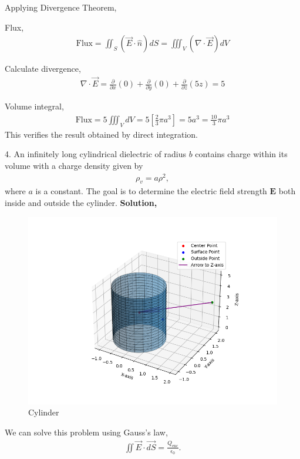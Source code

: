 \documentclass{article}
\begin{document}
Applying Divergence Theorem,

Flux,
\begin{align*}
\text{Flux} = \iint_S (\vec{E} \cdot \hat{n}) dS = \iiint_V (\nabla \cdot \vec{E}) dV
\end{align*}

Calculate divergence,
\begin{align*}
\nabla \cdot \vec{E} = 
    \frac{\partial}{\partial x}(0) +
    \frac{\partial}{\partial y}(0) +
    \frac{\partial}{\partial z}(5z) = 5
\end{align*}

Volume integral,
\begin{align*}
\text{Flux} = 5 \iiint_V dV
= 5 \left[\frac{2}{3}\pi a^3\right]
= 5a^3
= \frac{10}{3} \pi a^3
\end{align*}
This verifies the result obtained by direct integration.
\newline \newline

4. An infinitely long cylindrical dielectric of radius $b$ contains charge within its volume with a charge density given by
\begin{align*}
\rho_v = a \rho^2,
\end{align*}
where $a$ is a constant. The goal is to determine the electric field strength $\mathbf{E}$ both inside and outside the cylinder.\newline
\textbf{Solution, }\newline
\begin{figure}[h!]
   \centering
   \includegraphics[width=1\columnwidth]{figs/q4.png}
    \caption{Cylinder}
   \label{label}
\end{figure}
We can solve this problem using Gauss's law,
\begin{align*}
\iint \vec{E} \cdot \vec{dS} = \frac{Q_{\text{enc}}}{\epsilon_0}.
\end{align*}
\end{document}
